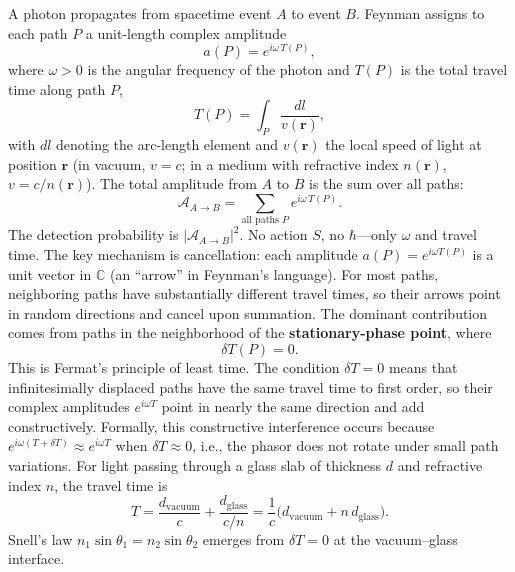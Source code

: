 \documentclass[11pt,a4paper]{article}
\newcommand{\C}{\mathbb{C}}
\begin{document}
A photon propagates from spacetime event $A$ to event $B$. Feynman assigns to each path $P$ a unit-length complex amplitude
\begin{equation}
a(P) = e^{i\omega\, T(P)},
\label{eq:feynman_amplitude}
\end{equation}
where $\omega > 0$ is the angular frequency of the photon and $T(P)$ is the total travel time along path $P$,
\begin{equation}
T(P) = \int_P \frac{dl}{v(\mathbf{r})},
\label{eq:travel_time}
\end{equation}
with $dl$ denoting the arc-length element and $v(\mathbf{r})$ the local speed of light at position $\mathbf{r}$ (in vacuum, $v = c$; in a medium with refractive index $n(\mathbf{r})$, $v = c/n(\mathbf{r})$). The total amplitude from $A$ to $B$ is the sum over all paths:
\begin{equation}
\mathcal{A}_{A\to B} = \sum_{\text{all paths } P} e^{i\omega\, T(P)}.
\label{eq:total_amplitude}
\end{equation}
The detection probability is $|\mathcal{A}_{A\to B}|^2$. No action $S$, no $\hbar$---only $\omega$ and travel time. The key mechanism is cancellation: each amplitude $a(P) = e^{i\omega T(P)}$ is a unit vector in $\C$ (an ``arrow'' in Feynman's language). For most paths, neighboring paths have substantially different travel times, so their arrows point in random directions and cancel upon summation. The dominant contribution comes from paths in the neighborhood of the \textbf{stationary-phase point}, where
\begin{equation}
\delta T(P) = 0.
\label{eq:fermat}
\end{equation}
This is Fermat's principle of least time. The condition $\delta T = 0$ means that infinitesimally displaced paths have the same travel time to first order, so their complex amplitudes $e^{i\omega T}$ point in nearly the same direction and add constructively. Formally, this constructive interference occurs because $e^{i\omega(T + \delta T)} \approx e^{i\omega T}$ when $\delta T \approx 0$, i.e., the phasor does not rotate under small path variations. For light passing through a glass slab of thickness $d$ and refractive index $n$, the travel time is
\begin{equation}
T = \frac{d_{\text{vacuum}}}{c} + \frac{d_{\text{glass}}}{c/n} = \frac{1}{c}\bigl(d_{\text{vacuum}} + n\,d_{\text{glass}}\bigr).
\end{equation}
Snell's law $n_1\sin\theta_1 = n_2\sin\theta_2$ emerges from $\delta T = 0$ at the vacuum--glass interface.
\end{document}
